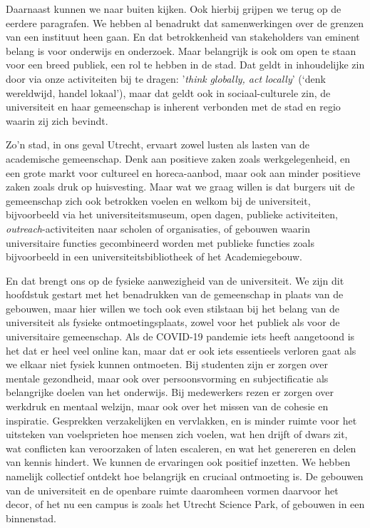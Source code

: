 \documentclass[smallauthor, chapterhaspagenum, nochapterinheader, pagenuminheader,  bigchapnum,medium2, tocpages, garamond, titleinheader]{jote-book}
\begin{document}
	Daarnaast kunnen we naar buiten kijken. Ook hierbij grijpen we terug op de eerdere paragrafen. We hebben al benadrukt dat samenwerkingen over de grenzen van een instituut heen gaan. En dat betrokkenheid van stakeholders van eminent belang is voor onderwijs en onderzoek. Maar belangrijk is ook om open te staan voor een breed publiek, een rol te hebben in de stad. Dat geldt in inhoudelijke zin door via onze activiteiten bij te dragen: '\emph{think}\emph{ }\emph{globally}\emph{, act }\emph{locally}' (‘denk wereldwijd, handel lokaal'), maar dat geldt ook in sociaal-culturele zin, de universiteit en haar gemeenschap is inherent verbonden met de stad en regio waarin zij zich bevindt.

	\enlargethispage{-\baselineskip}\checkandfixthelayout

	Zo'n stad, in ons geval Utrecht, ervaart zowel lusten als lasten van de academische gemeenschap. Denk aan positieve zaken zoals werkgelegenheid, en een grote markt voor cultureel en horeca-aanbod, maar ook aan minder positieve zaken zoals druk op huisvesting. Maar wat we graag willen is dat burgers uit de gemeenschap zich ook betrokken voelen en welkom bij de universiteit, bijvoorbeeld via het universiteitsmuseum, open dagen, publieke activiteiten, \emph{outreach}-activiteiten naar scholen of organisaties, of gebouwen waarin universitaire functies gecombineerd worden met publieke functies zoals bijvoorbeeld in een universiteitsbibliotheek of het Academiegebouw.



	En dat brengt ons op de fysieke aanwezigheid van de universiteit. We zijn dit hoofdstuk gestart met het benadrukken van de gemeenschap in plaats van de gebouwen, maar hier willen we toch ook even stilstaan bij het belang van de universiteit als fysieke ontmoetingsplaats, zowel voor het publiek als voor de universitaire gemeenschap. Als de COVID-19 pandemie iets heeft aangetoond is het dat er heel veel online kan, maar dat er ook iets essentieels verloren gaat als we elkaar niet fysiek kunnen ontmoeten. Bij studenten zijn er zorgen over mentale gezondheid, maar ook over persoonsvorming en subjectificatie als belangrijke doelen van het onderwijs. Bij medewerkers rezen er zorgen over werkdruk en mentaal welzijn, maar ook over het missen van de cohesie en inspiratie. Gesprekken verzakelijken en vervlakken, en is minder ruimte voor het uitsteken van voelsprieten hoe mensen zich voelen, wat hen drijft of dwars zit, wat conflicten kan veroorzaken of laten escaleren, en wat het genereren en delen van kennis hindert. We kunnen de ervaringen ook positief inzetten. We hebben namelijk collectief ontdekt hoe belangrijk en cruciaal ontmoeting is. De gebouwen van de universiteit en de openbare ruimte daaromheen vormen daarvoor het decor, of het nu een campus is zoals het Utrecht Science Park, of gebouwen in een binnenstad.
\end{document}
